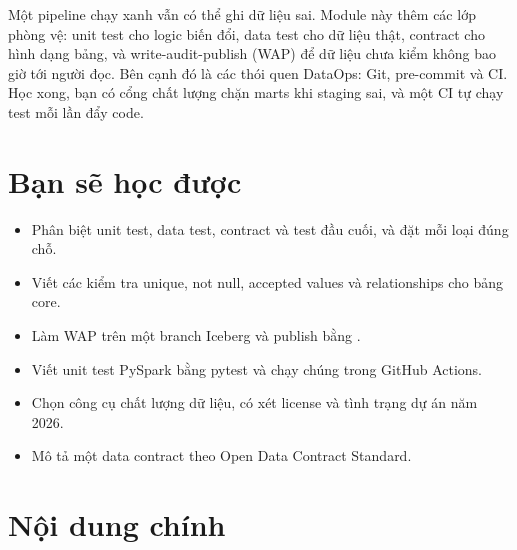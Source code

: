 
Một pipeline chạy xanh vẫn có thể ghi dữ liệu sai. Module này thêm các lớp phòng vệ: unit test cho logic biến đổi, data test cho dữ liệu thật, contract cho hình dạng bảng, và write-audit-publish (WAP) để dữ liệu chưa kiểm không bao giờ tới người đọc. Bên cạnh đó là các thói quen DataOps: Git, pre-commit và CI. Học xong, bạn có cổng chất lượng chặn marts khi staging sai, và một CI tự chạy test mỗi lần đẩy code.

\section{Bạn sẽ học được}
\begin{itemize}
  \item Phân biệt unit test, data test, contract và test đầu cuối, và đặt mỗi loại đúng chỗ.
  \item Viết các kiểm tra unique, not null, accepted values và relationships cho bảng core.
  \item Làm WAP trên một branch Iceberg và publish bằng .
  \item Viết unit test PySpark bằng pytest và chạy chúng trong GitHub Actions.
  \item Chọn công cụ chất lượng dữ liệu, có xét license và tình trạng dự án năm 2026.
  \item Mô tả một data contract theo Open Data Contract Standard.
\end{itemize}

\section{Nội dung chính}

